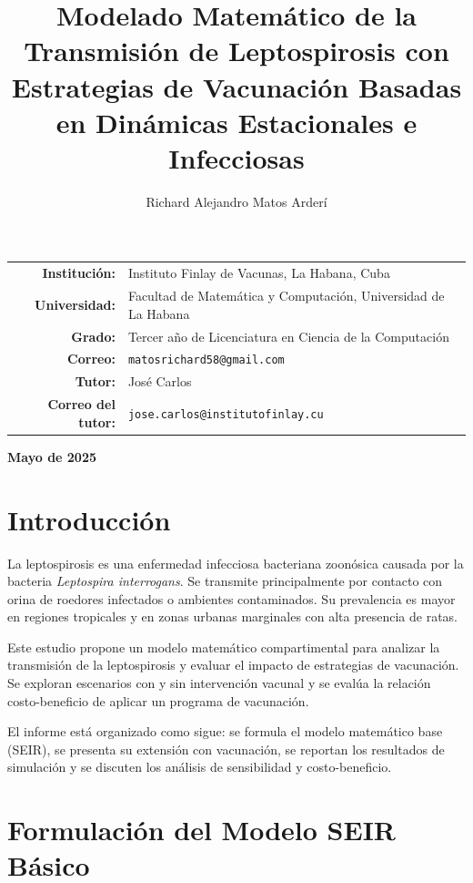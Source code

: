 \documentclass[12pt,a4paper]{article}
\title{\textbf{Modelado Matemático de la Transmisión de Leptospirosis con Estrategias de Vacunación Basadas en Dinámicas Estacionales e Infecciosas}}
\author{Richard Alejandro Matos Arderí}
\makeatletter
\newcommand{\institucion}{Instituto Finlay de Vacunas, La Habana, Cuba}
\newcommand{\universidad}{Facultad de Matemática y Computación, Universidad de La Habana}
\newcommand{\tutor}{José Carlos}
\newcommand{\tutorcorreo}{\texttt{jose.carlos@institutofinlay.cu}}
\newcommand{\grado}{Tercer año de Licenciatura en Ciencia de la Computación}
\newcommand{\correo}{\texttt{matosrichard58@gmail.com}}
\makeatother
\begin{document}
\maketitle

\vspace{-2em}
\begin{center}
    \begin{tabular}{rl}
        \textbf{Institución:} & \institucion \\
        \textbf{Universidad:} & \universidad \\
        \textbf{Grado:} & \grado \\
        \textbf{Correo:} & \correo \\
        \textbf{Tutor:} & \tutor \\
        \textbf{Correo del tutor:} & \tutorcorreo \\
    \end{tabular}
\end{center}
\vspace{1em}
\begin{center}
    \textbf{Mayo de 2025}
\end{center}
\thispagestyle{empty}
\newpage

\tableofcontents
\newpage

\section{Introducción}
La leptospirosis es una enfermedad infecciosa bacteriana zoonósica causada por la bacteria \textit{Leptospira interrogans}. Se transmite principalmente por contacto con orina de roedores infectados o ambientes contaminados. Su prevalencia es mayor en regiones tropicales y en zonas urbanas marginales con alta presencia de ratas.

Este estudio propone un modelo matemático compartimental para analizar la transmisión de la leptospirosis y evaluar el impacto de estrategias de vacunación. Se exploran escenarios con y sin intervención vacunal y se evalúa la relación costo-beneficio de aplicar un programa de vacunación.

El informe está organizado como sigue: se formula el modelo matemático base (SEIR), se presenta su extensión con vacunación, se reportan los resultados de simulación y se discuten los análisis de sensibilidad y costo-beneficio.

\newpage

\section{Formulación del Modelo SEIR Básico}
\end{document}
